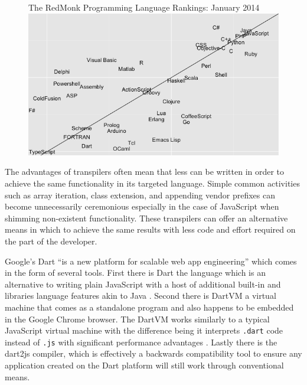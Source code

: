 \documentclass[final]{cmpreport}
\begin{document}

\begin{figure}[h]{The RedMonk Programming Language Rankings: January 2014 \label{ranking}}
  \includegraphics[width=1.0\textwidth]{lang-rank-114-wm.png}
\end{figure}

The advantages of transpilers often mean that less can be written in order to achieve the same functionality in its targeted language. Simple common activities such as array iteration, class extension, and appending vendor prefixes can become unnecessarily ceremonious especially in the case of JavaScript when shimming non-existent functionality. These transpilers can offer an alternative means in which to achieve the same results with less code and effort required on the part of the developer.

Google's Dart ``is a new platform for scalable web app engineering'' which comes in the form of several tools. First there is Dart the language which is an alternative to writing plain JavaScript with a host of additional built-in and libraries language features akin to Java \cite{Fortuna}. Second there is DartVM a virtual machine that comes as a standalone program and also happens to be embedded in the Google Chrome browser. The DartVM works similarly to a typical JavaScript virtual machine with the difference being it interprets \texttt{.dart} code instead of \texttt{.js} with significant performance advantages \cite{Schneider}. Lastly there is the dart2js compiler, which is effectively a backwards compatibility tool to ensure any application created on the Dart platform will still work through conventional means.
\end{document}
